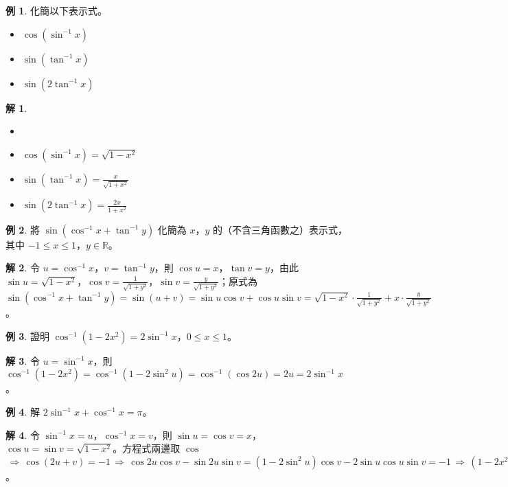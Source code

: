 \documentclass[12pt]{extarticle}
\newcommand{\ds}{\displaystyle}
\newcommand{\ie}{\,\Longrightarrow\,}
\theoremstyle{definition}
\newtheorem*{ex}{例}
\newtheorem*{sol}{解}
\newcommand{\myline}{\noindent\makebox[\linewidth]{\rule{\paperwidth}{0.4pt}}}
\begin{document}
\begin{ex} 化簡以下表示式。
  \begin{itemize}\setlength\itemsep{0em}
    \item $\cos(\sin^{-1} x)$
    \item $\sin(\tan^{-1} x)$
    \item $\sin(2\tan^{-1} x)$
  \end{itemize}
\end{ex}

\begin{sol} 
  \begin{itemize}\setlength\itemsep{0em}
    \item[]
    \item $\ds\cos(\sin^{-1} x) = \sqrt{1 - x^2}$
    \item $\ds\sin(\tan^{-1} x) = \frac{x}{\sqrt{1 + x^2}}$
    \item $\ds\sin(2\tan^{-1} x) = \frac{2x}{1 + x^2}$
  \end{itemize}
\end{sol}

\begin{ex}
  將 $\ds \sin(\cos^{-1} x + \tan^{-1}y)$ 化簡為 $x$，$y$ 的（不含三角函數之）表示式，其中 $-1\leqslant x\leqslant 1$，$y\in\mathbb{R}$。
\end{ex}

\begin{sol}
  令 $\ds u =\cos^{-1}x$，$\ds v=\tan^{-1} y$，則 $\cos u = x$，$\tan v = y$，由此 $\ds\sin u = \sqrt{1 - x^2}$，$\ds\cos v = \frac{1}{\sqrt{1 + y^2}}$，$\ds\sin v = \frac{y}{\sqrt{1 + y^2}}$；原式為 $\ds\sin(\cos^{-1} x + \tan^{-1}y) = \sin(u + v) = \sin u\cos v + \cos u\sin v = \sqrt{1 - x^2}\cdot\frac{1}{\sqrt{1 + y^2}} + x\cdot\frac{y}{\sqrt{1 + y^2}}$。
\end{sol}

\begin{ex}
  證明 $\ds\cos^{-1}(1 - 2x^2) = 2\sin^{-1}x$，$0\leqslant x\leqslant 1$。
\end{ex}

\begin{sol}
  令 $\ds u = \sin^{-1}x$，則 $\ds\cos^{-1}(1 - 2x^2) = \cos^{-1}(1 - 2\sin^2u) = \cos^{-1}(\cos 2u) = 2u = 2\sin^{-1}x$。
\end{sol}

\begin{ex}
  解 $\ds2\sin^{-1} x + \cos^{-1}x = \pi$。
\end{ex}

\begin{sol}
  令 $\ds\sin^{-1}x = u$，$\ds\cos^{-1}x = v$，則 $\ds\sin u = \cos v = x$，$\ds\cos u = \sin v = \sqrt{1 - x^2}$。方程式兩邊取 $\cos$ $\ds\ie\cos(2u + v) = -1 \ie \cos2u\cos v - \sin2u\sin v = (1 - 2\sin^2u)\cos v - 2\sin u\cos u\sin v = -1 \ie (1 - 2x^2)x - 2 x(1 - x^2) = -1 \ie x = 1$。
\end{sol}

\myline

%
%
\end{document}
